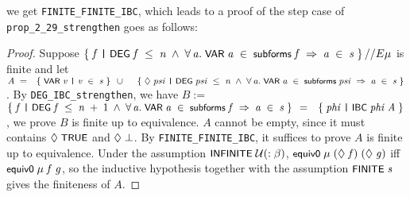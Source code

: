 \documentclass[letterpaper]{article}
\renewcommand{\HOLConst}[1]{{\textsf{\upshape\small #1}}}
\renewcommand{\HOLinline}[1]{\ensuremath{#1}}
\begin{document}
we get \texttt{FINITE_FINITE_IBC}, which leads to a proof of the step case of \texttt{prop_2_29_strengthen} goes as follows: 
\begin{proof}
Suppose \HOLinline{\HOLTokenLeftbrace{}\HOLBoundVar{f}\;\HOLTokenBar{}\;\HOLConst{DEG}\;\HOLBoundVar{f}\;\HOLSymConst{\HOLTokenLeq{}}\;\HOLFreeVar{n}\;\HOLSymConst{\HOLTokenConj{}}\;\HOLSymConst{\HOLTokenForall{}}\HOLBoundVar{a}.\;\HOLConst{VAR}\;\HOLBoundVar{a}\;\HOLSymConst{\HOLTokenIn{}}\;\HOLConst{subforms}\;\HOLBoundVar{f}\;\HOLSymConst{\HOLTokenImp{}}\;\HOLBoundVar{a}\;\HOLSymConst{\HOLTokenIn{}}\;\HOLFreeVar{s}\HOLTokenRightbrace{}\HOLSymConst{//E}\\
\HOLFreeVar{\ensuremath{\mu}}}
 is finite and let \HOLinline{\HOLFreeVar{A}\;\HOLSymConst{=}\\
\;\;\HOLTokenLeftbrace{}\HOLConst{VAR}\;\HOLBoundVar{v}\;\HOLTokenBar{}\;\HOLBoundVar{v}\;\HOLSymConst{\HOLTokenIn{}}\;\HOLFreeVar{s}\HOLTokenRightbrace{}\;\HOLSymConst{\HOLTokenUnion{}}\\
\;\;\;\;\HOLTokenLeftbrace{}\HOLSymConst{\ensuremath{\Diamond}}\;\HOLBoundVar{psi}\;\HOLTokenBar{}\;\HOLConst{DEG}\;\HOLBoundVar{psi}\;\HOLSymConst{\HOLTokenLeq{}}\;\HOLFreeVar{n}\;\HOLSymConst{\HOLTokenConj{}}\;\HOLSymConst{\HOLTokenForall{}}\HOLBoundVar{a}.\;\HOLConst{VAR}\;\HOLBoundVar{a}\;\HOLSymConst{\HOLTokenIn{}}\;\HOLConst{subforms}\;\HOLBoundVar{psi}\;\HOLSymConst{\HOLTokenImp{}}\;\HOLBoundVar{a}\;\HOLSymConst{\HOLTokenIn{}}\;\HOLFreeVar{s}\HOLTokenRightbrace{}}. By \texttt{DEG_IBC_strengthen}, we have $B:=$\HOLinline{\HOLTokenLeftbrace{}\HOLBoundVar{f}\;\HOLTokenBar{}\;\HOLConst{DEG}\;\HOLBoundVar{f}\;\HOLSymConst{\HOLTokenLeq{}}\;\HOLFreeVar{n}\;\HOLSymConst{\ensuremath{+}}\;\HOLNumLit{1}\;\HOLSymConst{\HOLTokenConj{}}\;\HOLSymConst{\HOLTokenForall{}}\HOLBoundVar{a}.\;\HOLConst{VAR}\;\HOLBoundVar{a}\;\HOLSymConst{\HOLTokenIn{}}\;\HOLConst{subforms}\;\HOLBoundVar{f}\;\HOLSymConst{\HOLTokenImp{}}\;\HOLBoundVar{a}\;\HOLSymConst{\HOLTokenIn{}}\;\HOLFreeVar{s}\HOLTokenRightbrace{}\;\HOLSymConst{=}\\
\;\;\HOLTokenLeftbrace{}\HOLBoundVar{phi}\;\HOLTokenBar{}\;\HOLConst{IBC}\;\HOLBoundVar{phi}\;\HOLFreeVar{A}\HOLTokenRightbrace{}}, we prove $B$ is finite up to equivalence. $A$ cannot be empty, since it must contains \HOLinline{\HOLSymConst{\ensuremath{\Diamond}}\;\HOLConst{TRUE}} and \HOLinline{\HOLSymConst{\ensuremath{\Diamond}}\;\HOLSymConst{\ensuremath{\bot}}}. By \texttt{FINITE_FINITE_IBC}, it suffices to prove $A$ is finite up to equivalence. Under the assumption \HOLinline{\HOLConst{INFINITE}\;\ensuremath{\cal{U}}(:\ensuremath{\beta})}, \HOLinline{\HOLConst{equiv0}\;\HOLFreeVar{\ensuremath{\mu}}\;(\HOLSymConst{\ensuremath{\Diamond}}\;\HOLFreeVar{f})\;(\HOLSymConst{\ensuremath{\Diamond}}\;\HOLFreeVar{g})} iff \HOLinline{\HOLConst{equiv0}\;\HOLFreeVar{\ensuremath{\mu}}\;\HOLFreeVar{f}\;\HOLFreeVar{g}}, so the inductive hypothesis together  with the assumption \HOLinline{\HOLConst{FINITE}\;\HOLFreeVar{s}} gives the finiteness of $A$.%
\end{proof}
\end{document}
